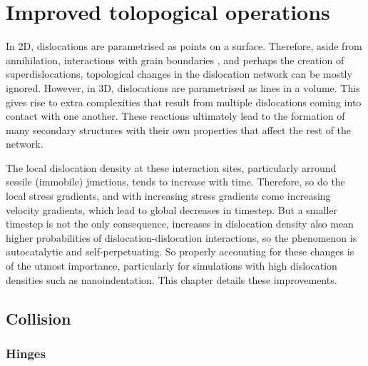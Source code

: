 \chapter{Improved tolopogical operations}
\label{c:topology}

In 2D, dislocations are parametrised as points on a surface. Therefore, aside from annihilation, interactions with grain boundaries \cite{grain_size_eff1, grain_size_eff2}, and perhaps the creation of superdislocations, topological changes in the dislocation network can be mostly ignored. However, in 3D, dislocations are parametrised as lines in a volume. This gives rise to extra complexities that result from multiple dislocations coming into contact with one another. These reactions ultimately lead to the formation of many secondary structures with their own properties that affect the rest of the network.

The local dislocation density at these interaction sites, particularly arround sessile (immobile) junctions, tends to increase with time. Therefore, so do the local stress gradients, and with increasing stress gradients come increasing velocity gradients, which lead to global decreases in timestep. But a smaller timestep is not the only consequence, increases in dislocation density also mean higher probabilities of dislocation-dislocation interactions, so the phenomenon is autocatalytic and self-perpetuating. So properly accounting for these changes is of the utmost importance, particularly for simulations with high dislocation densities such as nanoindentation. This chapter details these improvements.

\section{Collision}\label{s:collision}

\subsection{Hinges}\label{ss:hinges}


